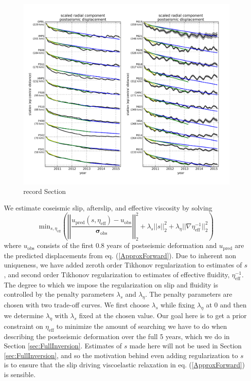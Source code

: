 \documentclass[review]{elsarticle}
\begin{document}
\begin{figure}
\includegraphics[scale=0.7]{Figures/RecordSectionDuration}
\centering 
\caption{record Section}
\label{fig:RecordSection1}
\end{figure}

We estimate coseismic slip, afterslip, and effective viscosity by solving 
\begin{equation}\label{ObjectiveFunction}
 \mathrm{min}_{s,\eta_\mathrm{eff}} \left(\left|\left|
 \frac{u_\mathrm{pred}(s,\eta_\mathrm{eff}) - u_\mathrm{obs}}
 {\mathbf{\sigma_\mathrm{obs}}}\right|\right|_2^2 + 
 \lambda_s||s||_2^2 + 
 \lambda_\eta||\nabla \eta_{\mathrm{eff}}^{-1}||_2^2\right)
\end{equation} 
where $u_\mathrm{obs}$ consists of the first 0.8 years of postseismic deformation and $u_\mathrm{pred}$ are the predicted displacements from eq. (\ref{ApproxForward}).  Due to inherent non uniqueness, we have added zeroth order Tikhonov regularization to estimates of $s$, and second order Tikhonov regularization to estimates of effective fluidity, $\eta_\mathrm{eff}^{-1}$. The degree to which we impose the regularization on slip and fluidity is controlled by the penalty parameters $\lambda_s$ and $\lambda_\eta$.  The penalty parameters are chosen with two trade-off curves. We first choose $\lambda_s$ while fixing $\lambda_\eta$ at 0 and then we determine $\lambda_\eta$ with $\lambda_s$ fixed at the chosen value. Our goal here is to get a prior constraint on $\eta_{\mathrm{eff}}$ to minimize the amount of searching we have to do when describing the postseismic deformation over the full 5 years, which we do in Section \ref{sec:FullInversion}.  Estimates of $s$ made here will not be used in Section \ref{sec:FullInversion}, and so the motivation behind even adding regularization to $s$ is to ensure that the slip driving viscoelastic relaxation in eq. (\ref{ApproxForward}) is sensible.  
\end{document}
